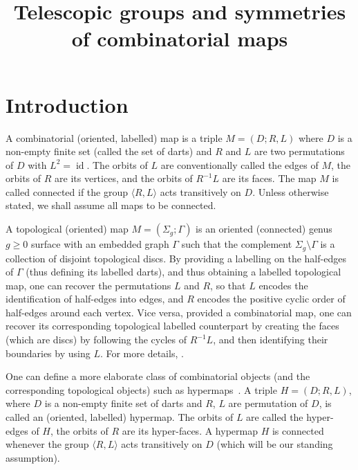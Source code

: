 \documentclass[ALCO,ThmDefs,Unicode,epreuves]{cedram}
\author{\firstname{R{\'e}mi} \lastname{Bottinelli}}
\author{\firstname{Laura} \lastname{Grave de Peralta}}
\author{\firstname{Alexander}\nobreakauthor\lastname{Kolpakov}}
\title[Telescopic groups and symmetries of combinatorial maps]{Telescopic groups and symmetries of combinatorial maps}
\DeclareMathOperator{\id}{id}
\begin{document}
\maketitle

\section{Introduction}\label{intro}

A combinatorial (oriented, labelled) map is a triple $M = (D; R, L)$ where $D$ is a non-empty finite set (called the set of darts) and $R$ and $L$ are two permutations of $D$ with $L^2 = \id $. The orbits of $L$ are conventionally called the edges of $M$, the orbits of $R$ are its vertices, and the orbits of $R^{-1}L$ are its faces. The map $M$ is called connected if the group $\langle R, L \rangle$ acts transitively on $D$. Unless otherwise stated, we shall assume all maps to be connected.

A topological (oriented) map $M = (\Sigma_g; \Gamma)$ is an oriented (connected) genus $g\geq 0$ surface with an embedded graph $\Gamma$ such that the complement $\Sigma_g \setminus \Gamma$ is a collection of disjoint topological discs. By providing a labelling on the half-edges of $\Gamma$ (thus defining its labelled darts), and thus obtaining a labelled topological map, one can recover the permutations $L$ and $R$, so that $L$ encodes the identification of half-edges into edges, and $R$ encodes the positive cyclic order of half-edges around each vertex. Vice versa, provided a combinatorial map, one can recover its corresponding topological labelled counterpart by creating the faces (which are discs) by following the cycles of $R^{-1}L$, and then identifying their boundaries by using $L$. For more details, %
\cf \cite{CM-Survey, JoSi, Tutte}.

One can define a more elaborate class of combinatorial objects (and the corresponding topological objects) such as hypermaps~\cite{Cori}. A triple $H = (D; R, L)$, where $D$ is a non-empty finite set of darts and $R$, $L$ are permutation of $D$, is called an (oriented, labelled) hypermap. The orbits of $L$ are called the hyper-edges of $H$, the orbits of $R$ are its hyper-faces. A hypermap $H$ is connected whenever the group $\langle R, L \rangle$ acts transitively on $D$ (which will be our standing assumption).
\end{document}
